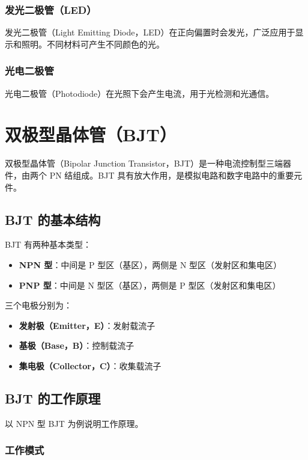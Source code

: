 \subsubsection{发光二极管（LED）}

发光二极管（Light Emitting Diode，LED）在正向偏置时会发光，广泛应用于显示和照明。不同材料可产生不同颜色的光。

\subsubsection{光电二极管}

光电二极管（Photodiode）在光照下会产生电流，用于光检测和光通信。

\section{双极型晶体管（BJT）}

双极型晶体管（Bipolar Junction Transistor，BJT）是一种电流控制型三端器件，由两个 PN 结组成。BJT 具有放大作用，是模拟电路和数字电路中的重要元件。

\subsection{BJT 的基本结构}

BJT 有两种基本类型：
\begin{itemize}
  \item \textbf{NPN 型}：中间是 P 型区（基区），两侧是 N 型区（发射区和集电区）
  \item \textbf{PNP 型}：中间是 N 型区（基区），两侧是 P 型区（发射区和集电区）
\end{itemize}

三个电极分别为：
\begin{itemize}
  \item \textbf{发射极（Emitter，E）}：发射载流子
  \item \textbf{基极（Base，B）}：控制载流子
  \item \textbf{集电极（Collector，C）}：收集载流子
\end{itemize}

\subsection{BJT 的工作原理}

以 NPN 型 BJT 为例说明工作原理。

\subsubsection{工作模式}

